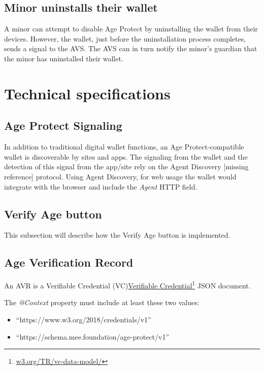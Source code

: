 \documentclass[11pt, oneside]{article}   	%
\newcommand{\hyperfootnote}[1][]{\def\ArgI{{#1}}\hyperfootnoteRelay}
\newcommand\hyperfootnoteRelay[2][]{\href{#1#2}{\ArgI}\footnote{\href{#1#2}{#2}}}
\begin{document}
\subsection{Minor uninstalls their wallet}

A minor can attempt to disable Age Protect by uninstalling the wallet from their devices. However, the wallet, just before the uninstallation process completes, sends a signal to the AVS. The AVS can in turn notify the minor's guardian that the minor has uninstalled their wallet.

\section{Technical specifications}

\subsection{Age Protect Signaling}
 
In addition to traditional digital wallet functions, an Age Protect-compatible wallet is discoverable by sites and apps. The signaling from the wallet and the detection of this signal from the app/site rely on the Agent Discovery \colorbox{BurntOrange}{[missing reference]} protocol. Using Agent Discovery, for web usage the wallet would integrate with the browser and include the \emph{Agent} HTTP field.

\subsection{Verify Age button}

This subsection will describe how the Verify Age button is implemented. 

\subsection{Age Verification Record}

An AVR is a Verifiable Credential (VC)\hyperfootnote[Verifiable Credential][https://]{w3.org/TR/vc-data-model/} JSON document. 

The \emph{@Context} property must include at least these two values:
\begin{itemize}
	\item ``https://www.w3.org/2018/credentials/v1''
	\item ``https://schema.mee.foundation/age-protect/v1''
\end{itemize}
\end{document}
